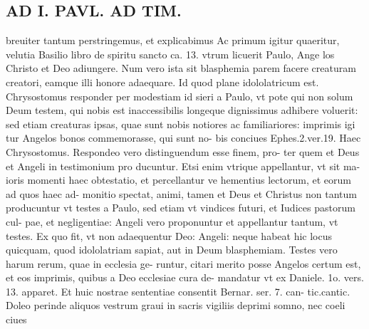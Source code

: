 \documentclass{article}
\begin{document}
\begin{pages}
\section*{AD I. PAVL. AD TIM. }
\marginpar{[ p.33- ]}\pstart breuiter tantum perstringemus, et explicabimus Ac primum igitur quaeritur, velutia Basilio libro de spiritu sancto ca. 13. vtrum licuerit Paulo, Ange los Christo et Deo adiungere. Num vero ista sit blasphemia parem facere creaturam creatori, eamque illi honore adaequare. Id quod plane idololatricum est. Chrysostomus responder per modestiam id sieri a Paulo, vt pote qui non solum Deum testem, qui nobis est inaccessibilis longeque dignissimus adhibere voluerit: sed etiam creaturas ipsas, quae sunt nobis notiores ac familiariores: imprimis igi tur Angelos bonos commemorasse, qui sunt no- bis conciues Ephes.2.ver.19. Haec Chrysostomus. Respondeo vero distinguendum esse finem, pro- ter quem et Deus et Angeli in testimonium pro ducuntur. Etsi enim vtrique appellantur, vt sit ma- ioris momenti haec obtestatio, et percellantur ve hementius lectorum, et eorum ad quos haec ad- monitio spectat, animi, tamen et Deus et Christus non tantum producuntur vt testes a Paulo, sed etiam vt vindices futuri, et Iudices pastorum cul- pae, et negligentiae: Angeli vero proponuntur et appellantur tantum, vt testes. Ex quo fit, vt non adaequentur Deo: Angeli: neque habeat hic locus quicquam, quod idololatriam sapiat, aut in Deum blasphemiam. Testes vero harum rerum, quae in ecclesia ge- runtur, citari merito posse Angelos certum est, et eos imprimis, quibus a Deo ecclesiae cura de- mandatur vt ex Daniele. 1o. vers. 13. apparet. Et huic nostrae sententiae consentit Bernar. ser. 7. can- tic.cantic. Doleo perinde aliquos vestrum graui in sacris vigiliis deprimi somno, nec coeli ciues  \pend

\end{pages}
\end{document}
